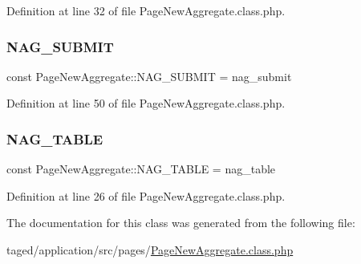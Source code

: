 Definition at line 32 of file Page\+New\+Aggregate.\+class.\+php.

\mbox{\label{class_page_new_aggregate_a9d233c16f3f66f98007fafe0623351e4}} 
\subsubsection{\texorpdfstring{N\+A\+G\+\_\+\+S\+U\+B\+M\+IT}{NAG\_SUBMIT}}
{\footnotesize\ttfamily const Page\+New\+Aggregate\+::\+N\+A\+G\+\_\+\+S\+U\+B\+M\+IT = \textquotesingle{}nag\+\_\+submit\textquotesingle{}}



Definition at line 50 of file Page\+New\+Aggregate.\+class.\+php.

\mbox{\label{class_page_new_aggregate_a4a670c16104e4a94f3bbf785d6c82c21}} 
\subsubsection{\texorpdfstring{N\+A\+G\+\_\+\+T\+A\+B\+LE}{NAG\_TABLE}}
{\footnotesize\ttfamily const Page\+New\+Aggregate\+::\+N\+A\+G\+\_\+\+T\+A\+B\+LE = \textquotesingle{}nag\+\_\+table\textquotesingle{}}



Definition at line 26 of file Page\+New\+Aggregate.\+class.\+php.



The documentation for this class was generated from the following file\+:\begin{DoxyCompactItemize}
\item 
taged/application/src/pages/\hyperlink{_page_new_aggregate_8class_8php}{Page\+New\+Aggregate.\+class.\+php}\end{DoxyCompactItemize}
